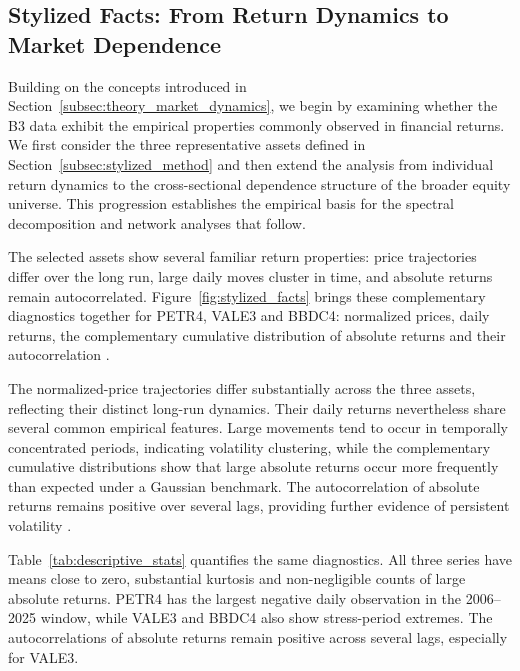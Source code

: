 \subsection{Stylized Facts: From Return Dynamics to Market Dependence}
\label{sec:stylized_correlation}

Building on the concepts introduced in Section~\ref{subsec:theory_market_dynamics}, we begin by examining whether the B3 data exhibit the empirical properties commonly observed in financial returns. We first consider the three representative assets defined in Section~\ref{subsec:stylized_method} and then extend the analysis from individual return dynamics to the cross-sectional dependence structure of the broader equity universe. This progression establishes the empirical basis for the spectral decomposition and network analyses that follow.

The selected assets show several familiar return properties: price trajectories differ over the long run, large daily moves cluster in time, and absolute returns remain autocorrelated. Figure~\ref{fig:stylized_facts} brings these complementary diagnostics together for PETR4, VALE3 and BBDC4: normalized prices, daily returns, the complementary cumulative distribution of absolute returns and their autocorrelation \cite{cont_2001_empirical}.

The normalized-price trajectories differ substantially across the three assets, reflecting their distinct long-run dynamics. Their daily returns nevertheless share several common empirical features. Large movements tend to occur in temporally concentrated periods, indicating volatility clustering, while the complementary cumulative distributions show that large absolute returns occur more frequently than expected under a Gaussian benchmark. The autocorrelation of absolute returns remains positive over several lags, providing further evidence of persistent volatility \cite{cont_2001_empirical}.

Table~\ref{tab:descriptive_stats} quantifies the same diagnostics. All three series have means close to zero, substantial kurtosis and non-negligible counts of large absolute returns. PETR4 has the largest negative daily observation in the 2006--2025 window, while VALE3 and BBDC4 also show stress-period extremes. The autocorrelations of absolute returns remain positive across several lags, especially for VALE3.

